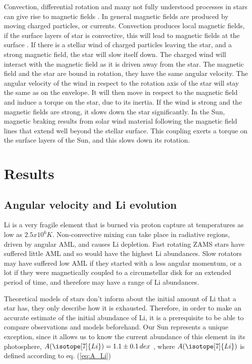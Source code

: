 \documentclass[fleqn,usenatbib]{mnras}
\begin{document}
Convection, differential rotation and many not fully understood processes in stars can give rise to magnetic fields \citet{Langer2012}. In general magnetic fields are produced by moving charged particles, or currents. Convection produces local magnetic fields, if the surface layers of star is convective, this will lead to magnetic fields at the surface \citet{Langer2012}. If there is a stellar wind of charged particles leaving the star, and a strong magnetic field, the star will slow itself down. The charged wind will interact with the magnetic field as it is driven away from the star. The magnetic field and the star are bound in rotation, they have the same angular velocity. The angular velocity of the wind in respect to the rotation axis of the star will stay the same as on the envelope. It will then move in respect to the magnetic field and induce a torque on the star, due to its inertia. If the wind is strong and the magnetic fields are strong, it slows down the star significantly. In the Sun, magnetic braking results from solar wind material following the magnetic field lines that extend well beyond the stellar surface. This coupling exerts a torque on the surface layers of the Sun, and this slows down its rotation.\par

\section{Results}
\subsection{Angular velocity and Li evolution}
Li is a very fragile element that is burned via proton capture at temperatures as low as $2.5 x 10^6 K$. Non-convective mixing can take place in radiative regions, driven by angular AML, and causes Li depletion. Fast rotating ZAMS stars have suffered little AML and so would have the highest Li abundances. Slow rotators may have suffered low AML if they started with a less angular momentum, or a lot if they were magnetically coupled to a circumstellar disk for an extended period of time, and therefore may have a range of Li abundances. \par

Theoretical models of stars don't inform about the initial amount of Li that a star has, they only describe how it is exhausted. Therefore, in order to make an accurate estimate of the initial abundance of Li, it is a prerequisite to be able to compare observations and models beforehand. Our Sun represents a unique exception, since it allows us to know the current abundance of this element in its photosphere, $A(\isotope[7]{Li}) = 1.1 \pm 0.1 \, dex$ \citep{Jeffries2004}, where $A(\isotope[7]{Li})$ is defined according to eq. (\ref{eq:A_Li})\par
\end{document}
